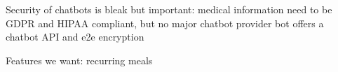 Security of chatbots is bleak but important: medical information need to be GDPR and HIPAA compliant, but no major chatbot provider bot offers a chatbot API and e2e encryption \cite{Alesanco2018}


Features we want: recurring meals


